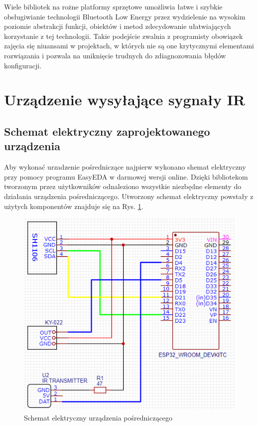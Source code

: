 \documentclass[12pt,twoside,draft]{article}
\begin{document}
Wiele bibliotek na rożne platformy sprzętowe umożliwia łatwe i szybkie obsługiwianie technologii Bluetooth Low Energy przez wydzielenie na wysokim poziomie abstrakcji funkcji, obiektów i metod zdecydowanie ułatwiających korzystanie z tej technologii. Takie podejście zwalnia z programisty obowiązek zajęcia się niuansami w projektach, w których nie są one krytycznymi elementami rozwiązania i pozwala na uniknięcie trudnych do zdiagnozowania błędów konfiguracji.

\clearpage

\section{Urządzenie wysyłające sygnały IR}
\subsection{Schemat elektryczny zaprojektowanego urządzenia}
Aby wykonać urzadzenie pośredniczące najpierw wykonano shemat elektryczny przy pomocy programu EasyEDA w darmowej wersji online\cite{easyEda}. Dzięki bibliotekom tworzonym przez użytkowników odnaleziono wszystkie niezbędne elementy do działania urządzenia pośredniczącego. Utworzony schemat elektryczny powstały z użytych komponentów znajduje się na Rys. \ref*{Fig:deviceScheme}.
\begin{figure}[ht]
   \centering
   \includegraphics[width=12cm]{images/deviceScheme.png}
   \caption{Schemat elektryczny urządzenia pośredniczącego}
   \label{Fig:deviceScheme}
\end{figure}
\end{document}
